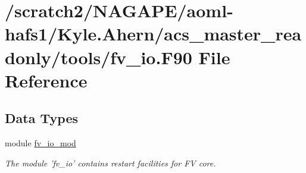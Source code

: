 \section{/scratch2/\-N\-A\-G\-A\-P\-E/aoml-\/hafs1/\-Kyle.Ahern/acs\-\_\-master\-\_\-readonly/tools/fv\-\_\-io.F90 File Reference}
\label{fv__io_8F90}
\subsection*{Data Types}
\begin{DoxyCompactItemize}
\item 
module \hyperlink{classfv__io__mod}{fv\-\_\-io\-\_\-mod}
\begin{DoxyCompactList}\small\item\em The module 'fv\-\_\-io' contains restart facilities for F\-V core. \end{DoxyCompactList}\end{DoxyCompactItemize}
